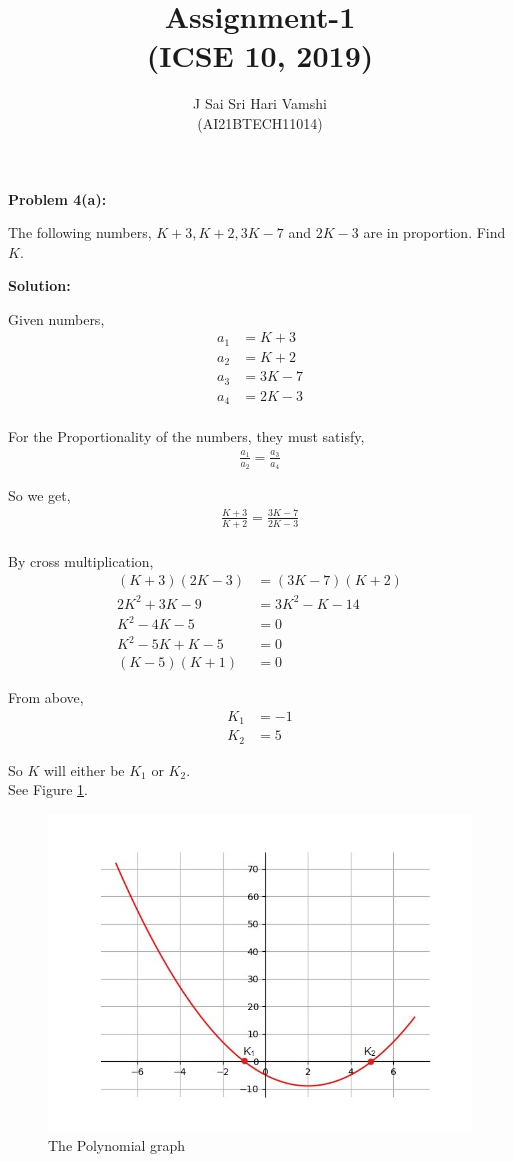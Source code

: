 \documentclass[journal,12pt,twocolumn]{article}\usepackage[margin=1.25 in]{geometry}
\title{\LARGE{\textbf{Assignment-1}\\(ICSE 10, 2019)}}
\author{\normalsize J Sai Sri Hari Vamshi\\ \footnotesize (AI21BTECH11014)}
\date{}
\begin{document}
\maketitle

\begin{center}
    \textbf{\large Problem 4(a):}
\end{center}
\noindent The following numbers, $K + 3, K + 2, 3K - 7$ and $2K - 3$ are in proportion. Find $K$.\\[2\baselineskip]

\begin{center}
    \textbf{\large Solution:}
\end{center}
\noindent Given numbers,
\begin{align*}
a_1 & = K + 3\\
a_2 & = K + 2\\
a_3 & = 3K - 7\\
a_4 & = 2K - 3\\
\end{align*}

\noindent For the Proportionality of the numbers, they must satisfy,
\begin{align*}
	\frac{a_1}{a_2} = \frac{a_3}{a_4}
\end{align*}

\noindent So we get,
\begin{align*}
	\frac{K + 3}{K + 2} = \frac{3K - 7}{2K - 3}\\
\end{align*}

\noindent By cross multiplication,
\begin{align*}
    (K + 3)(2K - 3) & = (3K - 7)(K + 2)\\
    2K^2 + 3K - 9 & = 3K^2 - K - 14\\
    K^2 - 4K - 5 & = 0\\
    K^2 - 5K + K - 5 & = 0\\
    (K - 5)(K + 1) & = 0
\end{align*}

\noindent From above,
\begin{align*}
	K_1 & = -1\\
	K_2 & = 5
\end{align*}

\noindent So $K$ will either be $K_1$ or $K_2$.\\
\noindent See Figure
	  \ref{fig:InkedFigure_1_py_LI.jpg}.
\begin{figure}
	  \centering 
	  \includegraphics[width=\columnwidth]{figs/InkedFigure_1_py_LI.jpg}
	  \caption{The Polynomial graph}
	  \label{fig:InkedFigure_1_py_LI.jpg}
	  \end{figure}
\end{document}
